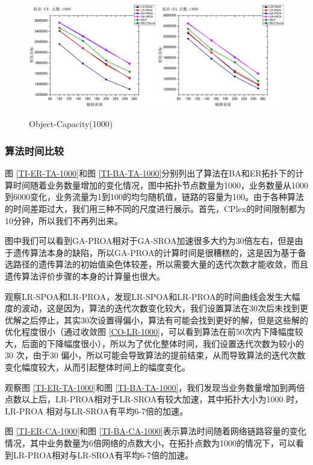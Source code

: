 \begin{figure}
\setlength{\belowcaptionskip}{-0.1cm}
\begin{center}
{\includegraphics[width=0.8 \textwidth]{figures/OB-CA.pdf}}
\end{center}
\caption{{\footnotesize{Object-Capacity(1000)}}}
\label{OB-CA}
\end{figure}
\subsubsection{算法时间比较}
图 \ref{TI-ER-TA-1000}和图 \ref{TI-BA-TA-1000}分别列出了算法在BA和ER拓扑下的计算时间随着业务数量增加的变化情况，图中拓扑节点数量为1000，业务数量从1000 到6000变化，业务流量为1到100的均匀随机值，链路的容量为100。由于各种算法的时间差距过大，我们用三种不同的尺度进行展示。首先，CPlex的时间限制都为10分钟，所以我们不再列出来。

图中我们可以看到GA-PROA相对于GA-SROA加速很多大约为30倍左右，但是由于遗传算法本身的缺陷，所以GA-PROA的计算时间是很糟糕的，这是因为基于备选路径的遗传算法的初始值染色体较差，所以需要大量的迭代次数才能收敛，而且遗传算法评价步骤的本身的计算量也很大。

观察LR-SPOA和LR-PROA，发现LR-SPOA和LR-PROA的时间曲线会发生大幅度的波动，这是因为，算法的迭代次数变化较大，我们设置算法在30次后未找到更优解之后停止，其实30次设置得偏小，算法有可能会找到更好的解，但是这些解的优化程度很小（通过收敛图 \ref{CO-LR-1000}，可以看到算法在前50次内下降幅度较大，后面的下降幅度很小），所以为了优化整体时间，我们设置迭代次数为较小的30 次，由于30 偏小，所以可能会导致算法的提前结束，从而导致算法的迭代次数变化幅度较大，从而引起整体时间上的幅度变化。

观察图 \ref{TI-ER-TA-1000}和图 \ref{TI-BA-TA-1000}，我们发现当业务数量增加到两倍点数以上后，LR-PROA相对于LR-SROA有较大加速，其中拓扑大小为1000 时，LR-PROA 相对与LR-SROA有平均6-7倍的加速。

图 \ref{TI-ER-CA-1000}和图 \ref{TI-BA-CA-1000}表示算法时间随着网络链路容量的变化情况，其中业务数量为6倍网络的点数大小，在拓扑点数为1000的情况下，可以看到LR-PROA相对与LR-SROA有平均6-7倍的加速。

